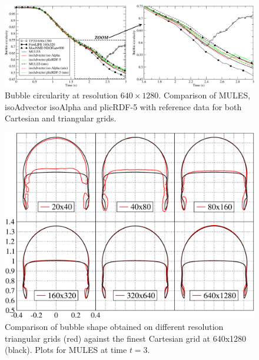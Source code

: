 \documentclass[review]{elsarticle}
\begin{document}
\begin{figure}[!h]
  \includegraphics[width=\textwidth]{figures/HysingB_bubble_circularity_640x1280.pdf}
  \caption{Bubble circularity at resolution $640\times1280$. Comparison of MULES, isoAdvector isoAlpha and plicRDF-5 with reference data for both Cartesian and triangular grids.}
  \label{fig:HB_bubble_circularity640}
\end{figure}


\begin{figure}[!h]
  \includegraphics[width=\textwidth]{figures/bubble_shape_t=3_compareOFMULES_Fineststruct_vs_uns_grids.pdf}
  \caption{Comparison of bubble shape obtained on different resolution triangular grids (red) against the finest Cartesian grid at 640x1280 (black). Plots for MULES at time $t=3$.}
  \label{fig:HB_compareOFMULES_Fineststruct.vs.uns}
\end{figure}
\end{document}
